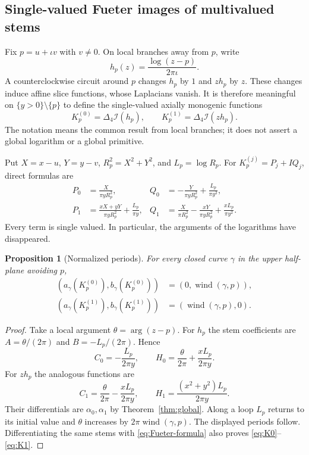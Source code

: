 \documentclass[11pt,a4paper]{article}
\numberwithin{equation}{section}
\newtheorem{proposition}[theorem]{Proposition}
\theoremstyle{definition}
\theoremstyle{remark}
\newcommand{\cI}{\mathcal I}
\newcommand{\lap}{\Delta_4}
\newcommand{\wind}{\operatorname{wind}}
\newcommand{\Kzero}{K_p^{(0)}}
\newcommand{\Kone}{K_p^{(1)}}
\begin{document}
\subsection{Single-valued Fueter images of multivalued stems}
Fix $p=u+\iota v$ with $v\ne0$. On local branches away from $p$, write
\begin{equation}\label{eq:logstem}
 h_p(z)=\frac{\log(z-p)}{2\pi\iota}.
\end{equation}
A counterclockwise circuit around $p$ changes $h_p$ by $1$ and $zh_p$ by $z$.
These changes induce affine slice functions, whose Laplacians vanish. It is
therefore meaningful on $\{y>0\}\setminus\{p\}$ to define the single-valued
axially monogenic functions
\begin{equation}\label{eq:K-definition}
 \Kzero=\lap\cI(h_p),\qquad \Kone=\lap\cI(zh_p).
\end{equation}
The notation means the common result from local branches; it does not assert
a global logarithm or a global primitive.

Put $X=x-u$, $Y=y-v$, $R_p^2=X^2+Y^2$, and $L_p=\log R_p$. For
$K_p^{(j)}=P_j+IQ_j$, direct formulas are
\begin{align}
 P_0&=\frac{X}{\pi yR_p^2},&
 Q_0&=-\frac{Y}{\pi yR_p^2}+\frac{L_p}{\pi y^2},
 \label{eq:K0}\\
 P_1&=\frac{xX+yY}{\pi yR_p^2}+\frac{L_p}{\pi y},&
 Q_1&=\frac{X}{\pi R_p^2}-\frac{xY}{\pi yR_p^2}
                +\frac{xL_p}{\pi y^2}.
 \label{eq:K1}
\end{align}
Every term is single valued. In particular, the arguments of the logarithms
have disappeared.

\begin{proposition}[Normalized periods]\label{prop:K-periods}
For every closed curve $\gamma$ in the upper half-plane avoiding $p$,
\begin{align}
 (a_\gamma(\Kzero),b_\gamma(\Kzero))
   &=(0,\wind(\gamma,p)),\label{eq:K-period0}\\
 (a_\gamma(\Kone),b_\gamma(\Kone))
   &=(\wind(\gamma,p),0).\label{eq:K-period1}
\end{align}
\end{proposition}
\begin{proof}
Take a local argument $\theta=\arg(z-p)$. For $h_p$ the stem coefficients are
$A=\theta/(2\pi)$ and $B=-L_p/(2\pi)$. Hence
\[
 C_0=-\frac{L_p}{2\pi y},\qquad
 H_0=\frac{\theta}{2\pi}+\frac{xL_p}{2\pi y}.
\]
For $zh_p$ the analogous functions are
\[
 C_1=\frac{\theta}{2\pi}-\frac{xL_p}{2\pi y},\qquad
 H_1=\frac{(x^2+y^2)L_p}{2\pi y}.
\]
Their differentials are $\alpha_0,\alpha_1$ by
Theorem~\ref{thm:global}. Along a loop $L_p$ returns to its initial value and
$\theta$ increases by $2\pi\wind(\gamma,p)$. The displayed periods follow.
Differentiating the same stems with \eqref{eq:Fueter-formula} also proves
\eqref{eq:K0}--\eqref{eq:K1}.
\end{proof}
\end{document}

